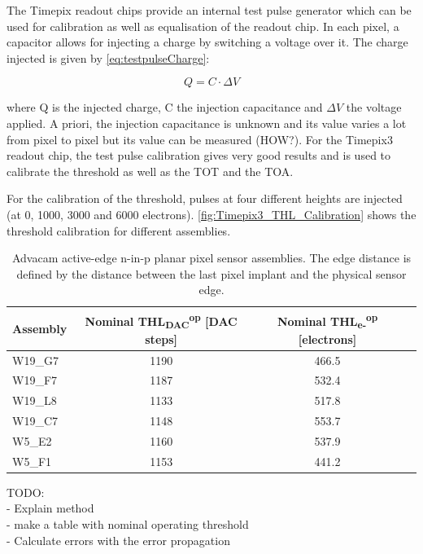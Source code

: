 The Timepix readout chips provide an internal test pulse generator
which can be used for calibration as well as equalisation of the
readout chip. In each pixel, a capacitor allows for injecting a charge
by switching a voltage over it. The charge injected is given by
\cref{eq:testpulseCharge}:

\begin{equation}
  Q = C \cdot \Delta V
  \label{eq:testpulseCharge}
\end{equation}

where Q is the injected charge, C the injection capacitance and
$\Delta V$ the voltage applied. A priori, the injection capacitance is
unknown and its value varies a lot from pixel to pixel but its value
can be measured (HOW?). 
For the Timepix3 readout chip, the test pulse calibration gives very
good results and is used to calibrate the threshold as well as the TOT
and the TOA. 

For the calibration of the threshold, pulses at four different heights
are injected (at 0, 1000, 3000 and 6000
electrons). \cref{fig:Timepix3_THL_Calibration} shows the threshold
calibration for different assemblies. 



\begin{table}[htbp]
  \centering
  \caption{Advacam active-edge n-in-p planar pixel sensor assemblies. The edge distance is defined by the distance between the last pixel implant and the physical sensor edge.}
  \label{tab:NominalThreshold}
  \begin{tabular}{lccc}
    \toprule
    Assembly & Nominal THL\textsubscript{DAC}\textsuperscript{op} [DAC steps] & Nominal THL\textsubscript{e-}\textsuperscript{op} [electrons]\\
    \midrule
    W19\_G7 & 1190 & 466.5\\
    W19\_F7 & 1187 & 532.4\\ \hline
    W19\_L8 & 1133 & 517.8\\
    W19\_C7 & 1148 & 553.7\\
    W5\_E2 & 1160 & 537.9\\ \hline
    W5\_F1 & 1153 & 441.2\\
    \bottomrule
  \end{tabular}
\end{table}


TODO:\\ 
- Explain method\\
- make a table with nominal operating threshold\\
- Calculate errors with the error propagation\\


